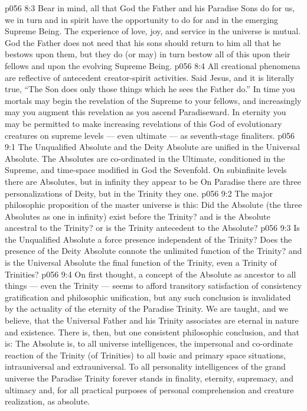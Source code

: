 \vs p056 8:3 Bear in mind, all that God the Father and his Paradise Sons do for us, we in turn and in spirit have the opportunity to do for and in the emerging Supreme Being. The experience of love, joy, and service in the universe is mutual. God the Father does not need that his sons should return to him all that he bestows upon them, but they do (or may) in turn bestow all of this upon their fellows and upon the evolving Supreme Being.
\vs p056 8:4 All creational phenomena are reflective of antecedent creator\hyp{}spirit activities. Said Jesus, and it is literally true, “The Son does only those things which he sees the Father do.” In time you mortals may begin the revelation of the Supreme to your fellows, and increasingly may you augment this revelation as you ascend Paradiseward. In eternity you may be permitted to make increasing revelations of this God of evolutionary creatures on supreme levels --- even ultimate --- as seventh\hyp{}stage finaliters.
\vs p056 9:1 The Unqualified Absolute and the Deity Absolute are unified in the Universal Absolute. The Absolutes are co\hyp{}ordinated in the Ultimate, conditioned in the Supreme, and time\hyp{}space modified in God the Sevenfold. On subinfinite levels there are  Absolutes, but in infinity they appear to be  On Paradise there are three personalizations of Deity, but in the Trinity they  one.
\vs p056 9:2 \pc The major philosophic proposition of the master universe is this: Did the Absolute (the three Absolutes as one in infinity) exist before the Trinity? and is the Absolute ancestral to the Trinity? or is the Trinity antecedent to the Absolute?
\vs p056 9:3 Is the Unqualified Absolute a force presence independent of the Trinity? Does the presence of the Deity Absolute connote the unlimited function of the Trinity? and is the Universal Absolute the final function of the Trinity, even a Trinity of Trinities?
\vs p056 9:4 On first thought, a concept of the Absolute as ancestor to all things --- even the Trinity --- seems to afford transitory satisfaction of consistency gratification and philosophic unification, but any such conclusion is invalidated by the actuality of the eternity of the Paradise Trinity. We are taught, and we believe, that the Universal Father and his Trinity associates are eternal in nature and existence. There is, then, but one consistent philosophic conclusion, and that is: The Absolute is, to all universe intelligences, the impersonal and co\hyp{}ordinate reaction of the Trinity (of Trinities) to all basic and primary space situations, intrauniversal and extrauniversal. To all personality intelligences of the grand universe the Paradise Trinity forever stands in finality, eternity, supremacy, and ultimacy and, for all practical purposes of personal comprehension and creature realization, as absolute.
